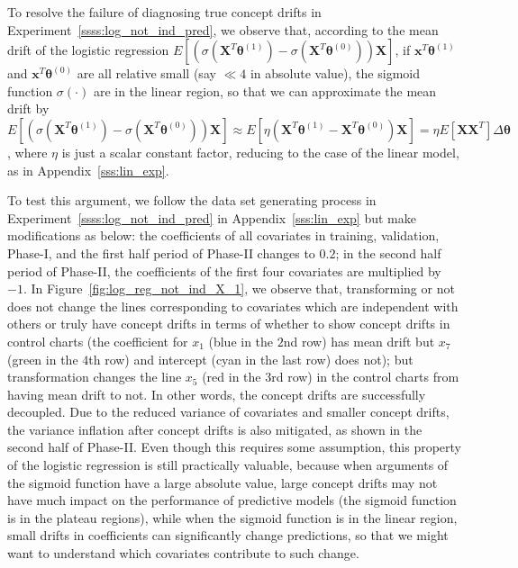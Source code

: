 \documentclass[twoside,11pt]{article}
\begin{document}
\begin{appendix}
To resolve the failure of diagnosing true concept drifts in Experiment~\ref{ssss:log_not_ind_pred}, we observe that, according to the mean drift of the logistic regression $E [ (\sigma (\bm {X}^T\bm { \theta}^{ (1)}) - \sigma ( \bm {X}^T\bm { \theta}^{ (0)})) \bm {X}] $, if $ \bm {x}^T\bm { \theta}^{ (1)}$ and $ \bm {x}^T\bm { \theta}^{ (0)}$ are all relative small (say $\ll 4$ in absolute value), the sigmoid function $ \sigma (\cdot)$ are in the linear region, so that we can approximate the mean drift by $E [ (\sigma ( \bm {X}^T\bm { \theta}^{ (1)} ) - \sigma ( \bm {X}^T\bm { \theta}^{ (0)} )) \bm {X}] \approx E [ \eta( \bm {X}^T\bm { \theta}^{ (1)} -  \bm {X}^T\bm { \theta}^{ (0)} ) \bm {X}] = \eta E[\bm{XX}^T] \Delta \bm { \theta} $, where $ \eta$ is just a scalar constant factor, reducing to the case of the linear model, as in Appendix~\ref{sss:lin_exp}.  

To test this argument, we follow the data set generating process in Experiment~\ref{ssss:log_not_ind_pred} in Appendix~\ref{sss:lin_exp} but make modifications as below: the coefficients of all covariates in training, validation, Phase-I, and the first half period of Phase-II changes to $0.2$; in the second half period of Phase-II, the coefficients of the first four covariates are multiplied by $-1$. In Figure~\ref{fig:log_reg_not_ind_X_1}, we observe that, transforming or not does not change the lines corresponding to covariates which are independent with others or truly have concept drifts in terms of whether to show concept drifts in control charts (the coefficient for $x_1$ (blue in the $2$nd row) has mean drift but $x_7$ (green in the $4$th row) and intercept (cyan in the last row) does not); but transformation changes the line $x_5$ (red in the $3$rd row) in the control charts from having mean drift to not. In other words, the concept drifts are successfully decoupled. Due to the reduced variance of covariates and smaller concept drifts, the variance inflation after concept drifts is also mitigated, as shown in the second half of Phase-II. Even though this requires some assumption, this property of the logistic regression is still practically valuable, because when arguments of the sigmoid function have a large absolute value, large concept drifts may not have much impact on the performance of predictive models (the sigmoid function is in the plateau regions), while when the sigmoid function is in the linear region, small drifts in coefficients can significantly change predictions, so that we might want to understand which covariates contribute to such change.


\end{appendix}
\end{document}
